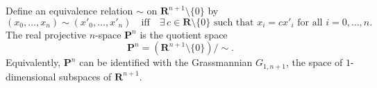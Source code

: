 Define an equivalence relation $\sim$ on $\mathbf{R}^{n+1} \setminus \{0\}$ by
\[
(x_0,\ldots,x_n) \sim (x'_0,\ldots,x'_n) \quad \text{iff} \quad \exists\, c \in \mathbf{R} \setminus \{0\} \text{ such that } x_i = c x'_i \text{ for all } i = 0,\ldots,n.
\]
The real projective $n$-space $\mathbf{P}^n$ is the quotient space
\[
\mathbf{P}^n = (\mathbf{R}^{n+1} \setminus \{0\}) / {\sim}.
\]
Equivalently, $\mathbf{P}^n$ can be identified with the Grassmannian $G_{1,n+1}$, the space of $1$-dimensional subspaces of $\mathbf{R}^{n+1}$.
